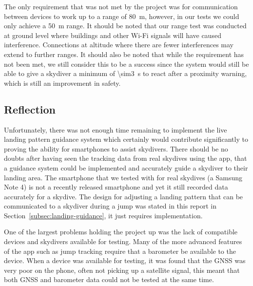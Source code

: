 The only requirement that was not met by the project was for communication between devices to work up to a range of \SI{80}{\metre}, however, in our tests we could only achieve a \SI{50}{\metre} range. It should be noted that our range test was conducted at ground level where buildings and other Wi-Fi signals will have caused interference. Connections at altitude where there are fewer interferences may extend to further ranges. It should also be noted that while the requirement has not been met, we still consider this to be a success since the system would still be able to give a skydiver a minimum of \SI{\sim3}{\second} to react after a proximity warning, which is still an improvement in safety.

\subsection{Reflection}
Unfortunately, there was not enough time remaining to implement the live landing pattern guidance system which certainly would contribute significantly to proving the ability for smartphones to assist skydivers. There should be no doubts after having seen the tracking data from real skydives using the app, that a guidance system could be implemented and accurately guide a skydiver to their landing area. The smartphone that we tested with for real skydives (a Samsung Note 4) is not a recently released smartphone and yet it still recorded data accurately for a skydive. The design for adjusting a landing pattern that can be communicated to a skydiver during a jump was stated in this report in Section~\ref{subsec:landing-guidance}, it just requires implementation.

One of the largest problems holding the project up was the lack of compatible devices and skydivers available for testing. Many of the more advanced features of the app such as jump tracking require that a barometer be available to the device. When a device was available for testing, it was found that the GNSS was very poor on the phone, often not picking up a satellite signal, this meant that both GNSS and barometer data could not be tested at the same time.

